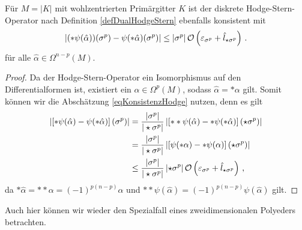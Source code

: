   \begin{folgerung}
    Für \( M=|K| \) mit wohlzentrierten Primärgitter \( K \) ist der diskrete Hodge-Stern-Operator nach Definition \ref{defDualHodgeStern} ebenfalls konsistent mit
    \begin{align}
      \label{eqKonsistenzDualHodge}
      \left| (*\psi(\hat\alpha))(\sigma^{p}) - \psi(*\hat\alpha)(\sigma^{p})\right| \le \left| \sigma^{p} \right| \mathcal{O}\left(\varepsilon_{\sigma^{p}} + \hat{l}_{\star\sigma^{p}}\right) \,\text{.}
    \end{align}
    für alle \( \hat\alpha\in\Omega^{n-p}(M) \).
  \end{folgerung}
  \begin{proof}
    Da der Hodge-Stern-Operator ein Isomorphismus auf den Differentialformen ist, existiert ein \( \alpha\in\Omega^{p}(M) \), sodass \( \hat\alpha = *\alpha \) gilt.
    Somit können wir die Abschätzung \eqref{eqKonsistenzHodge} nutzen, denn es gilt
    \begin{align}
      \left| \left[ *\psi(\hat\alpha) - \psi(*\hat\alpha) \right](\sigma^{p}) \right|
        &= \frac{|\sigma^{p}|}{|\star\sigma^{p}|} \left| \left[ **\psi(\hat\alpha) - *\psi(*\hat\alpha) \right](\star\sigma^{p}) \right| \\
        &= \frac{|\sigma^{p}|}{|\star\sigma^{p}|} \left| \left[ \psi(*\alpha) - *\psi(\alpha) \right](\star\sigma^{p}) \right|\\
        &\le  \frac{|\sigma^{p}|}{|\star\sigma^{p}|} \left| \star\sigma^{p} \right| \mathcal{O}\left(\varepsilon_{\sigma^{p}} + \hat{l}_{\star\sigma^{p}}\right) \,\text{,}
    \end{align}
    da \( *\hat\alpha = **\alpha = (-1)^{p(n-p)}\alpha \) und \( **\psi(\hat\alpha) =  (-1)^{p(n-p)}\psi(\hat\alpha)\)
    gilt.
  \end{proof}

  Auch hier können wir wieder den Spezialfall eines zweidimensionalen Polyeders betrachten.
  

